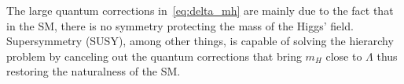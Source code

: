 The large quantum corrections in~\eqref{eq:delta_mh} are mainly due to the fact
that in the SM, there is no symmetry protecting the mass of the Higgs'
field. Supersymmetry (SUSY), among other things, is capable of solving the
hierarchy problem by canceling out the quantum corrections that bring $m_H$
close to $\Lambda$ thus restoring the naturalness of the SM.
